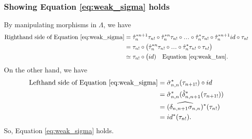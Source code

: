 \subsubsection{Showing Equation \ref{eq:weak_sigma} holds}
By manipulating morphisms in $\Lambda$, 
we have
\begin{align*}
\textrm{Righthand side of Equation \ref{eq:weak_sigma}}
&= 
\hat{\tau}_n^{*n+1}\tau_{n!} \circ 
  \hat{\tau}_n^{*n}\tau_{n!} \circ 
  \smdots \circ 
  \hat{\tau}_n^*\tau_{n!} \circ
  \hat{\tau}_n^{*n+1} id \circ 
  \tau_{n!}\\
&= 
\tau_{n!} \circ \big(
  \hat{\tau}_n^{*n}\tau_{n!} \circ 
  \smdots \circ 
  \hat{\tau}_n^*\tau_{n!} \circ
  \tau_{n!} \big)\\
&\simeq
\tau_{n!} \circ \big(id)
  \quad \textrm{Equation \ref{eq:weak_tau}.}\\  
\end{align*}
On the other hand, we have 
\begin{align*}
\textrm{Lefthand side of Equation \ref{eq:weak_sigma}}
&=
\hat{\sigma}_{n,n}^*(\tau_{n+1!}) \circ id\\
&=
\hat{\sigma}_{n,n}^*(
  \hat{\delta}_{n,n+1}^*(\tau_{n+1!}))\\
&=
(\widehat{\delta_{n,n+1}\sigma_{n,n}})^*
  (\tau_{n!})\\  
&=
id^*(\tau_{n!}).   
\end{align*}
So, Equation \ref{eq:weak_sigma} holds.